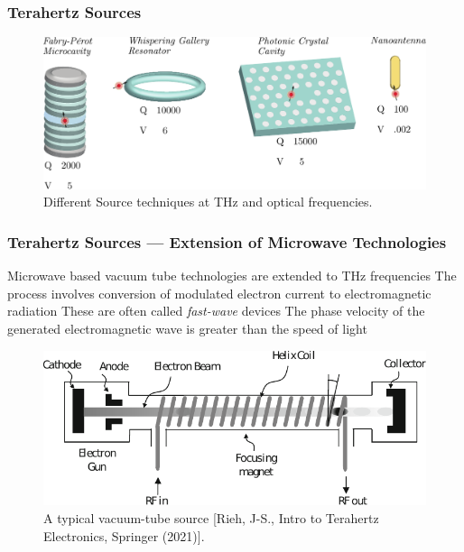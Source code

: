 \documentclass[10pt]{beamer}
\begin{document}
\begin{frame}
    \frametitle{Terahertz Sources}

    \begin{figure}[h!]
        \centering
        \includegraphics[width=.75\textwidth]{Curto_resonator.pdf}
        \caption{Different Source techniques at THz and optical frequencies.}
    \end{figure}


\end{frame}

\begin{frame}
    \frametitle{Terahertz Sources — Extension of Microwave Technologies}
    \small
    \begin{outline}
        \1 Microwave based vacuum tube technologies are extended to THz frequencies
        \2 The process involves conversion of modulated electron current to electromagnetic radiation
        \2 These are often called \textit{fast-wave} devices
        \2 The phase velocity of the generated electromagnetic wave is greater than the speed of light
    \end{outline}
    \begin{figure}[h!]
        \centering
        \includegraphics[width=.65\textwidth]{electron_gun.pdf}
        \caption{A typical vacuum-tube source \tiny{[Rieh, J-S.,  Intro to Terahertz Electronics, Springer (2021)]}.}
    \end{figure}
\end{frame}
\end{document}
